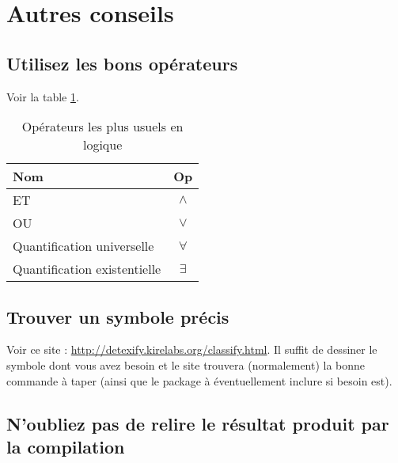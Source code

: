 \documentclass[a4paper, 11pt, oneside]{article}
\begin{document}
\section{Autres conseils}

\subsection{Utilisez les bons opérateurs}

Voir la table \ref{table:op}.

\begin{table}[!h]
\centering
\begin{tabular}{l c}
Nom & Op \\
\hline
ET & $\land$ \\
OU & $\lor$ \\
Quantification universelle & $\forall$ \\
Quantification existentielle & $\exists$ \\
\end{tabular}
\caption{Opérateurs les plus usuels en logique}
\label{table:op}
\end{table}

\subsection{Trouver un symbole précis}

Voir ce site : \url{http://detexify.kirelabs.org/classify.html}. Il suffit de dessiner le symbole dont vous avez besoin et le site trouvera (normalement) la bonne commande à taper (ainsi que le package à éventuellement inclure si besoin est).

\subsection{N'oubliez pas de relire le résultat produit par la compilation}
\end{document}
